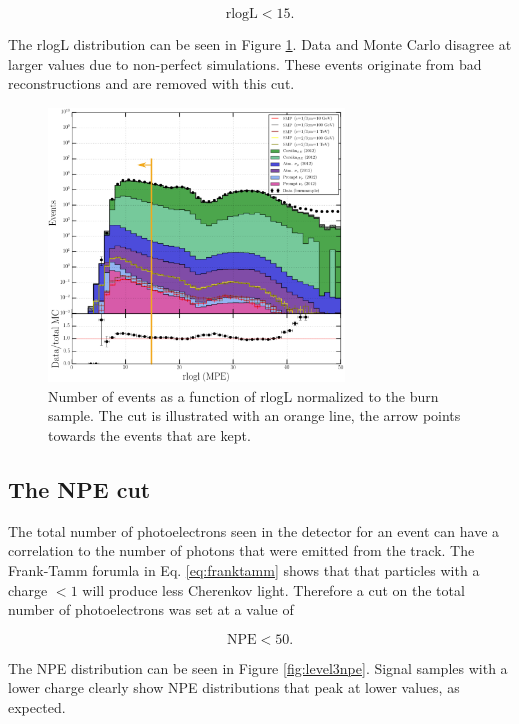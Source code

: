 \begin{equation}
\textrm{rlogL} < 15.
\end{equation}

The rlogL distribution can be seen in Figure \ref{fig:level3cutsrlogl}. Data and Monte Carlo disagree at larger values due to non-perfect simulations. These events originate from bad reconstructions and are removed with this cut.


\begin{figure}[t]
\centering
\includegraphics[width=0.7\textwidth]{chapter8/img/1D_stack_mpefit_rlogl_new.png}
\caption{Number of events as a function of rlogL normalized to the burn sample. The cut is illustrated with an orange line, the arrow points towards the events that are kept.}
\label{fig:level3cutsrlogl}
\end{figure}


\subsection{The NPE cut}
The total number of photoelectrons seen in the detector for an event can have a correlation to the number of photons that were emitted from the track. The Frank-Tamm forumla in Eq. \ref{eq:franktamm} shows that that particles with a charge $< 1$ will produce less Cherenkov light. Therefore a cut on the total number of photoelectrons was set at a value of 

\begin{equation}
\textrm{NPE} < 50.
\end{equation} 

The NPE distribution can be seen in Figure \ref{fig:level3npe}. Signal samples with a lower charge clearly show NPE distributions that peak at lower values, as  expected. 

